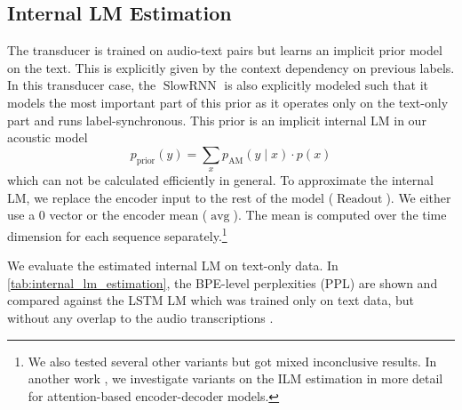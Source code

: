 \documentclass[a4paper]{article}
\newcommand{\decoder}{\ensuremath{\operatorname{SlowRNN}}}
\newcommand{\ilmAvgName}{\ensuremath{\operatorname{avg}}}
\begin{document}
\subsection{Internal LM Estimation}
\label{sec:internal_lm_estimation}

The transducer is trained on audio-text pairs
but learns an implicit prior model on the text.
This is explicitly given by the context dependency on previous labels.
In this transducer case, the \decoder{} is also explicitly modeled
such that it models the most important part of this prior
as it operates only on the text-only part
and runs label-synchronous.
This prior is an implicit internal LM in our acoustic model
\[ p_{\mathrm{prior}}( y ) = \sum_{x} p_{\mathrm{AM}}(y \mid x) \cdot p(x) \]
which can not be calculated efficiently in general.
To approximate the internal LM,
we replace the encoder input
to the rest of the model ($\operatorname{Readout}$).
We either use a $0$ vector or the encoder mean (\ilmAvgName).
The mean is computed over the time dimension for each sequence separately.\footnote{We also tested several other variants but got mixed inconclusive results.
In another work \cite{zeineldeen2021ilm}, we investigate variants on the ILM estimation in more detail
for attention-based encoder-decoder models.}

We evaluate the estimated internal LM on
text-only data.
In \cref{tab:internal_lm_estimation}, the BPE-level perplexities (PPL)
are shown and compared against the LSTM LM which was
trained only on text data,
but without any overlap to the audio transcriptions \cite{panayotov2015librispeech}.
\end{document}
